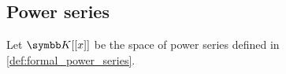\subsection{Power series}\label{subsec:power_series}

\begin{definition}\label{def:convergent_power_series}
  Let \( \K[[x]] \) be the space of power series defined in \cref{def:formal_power_series}.
\end{definition}
